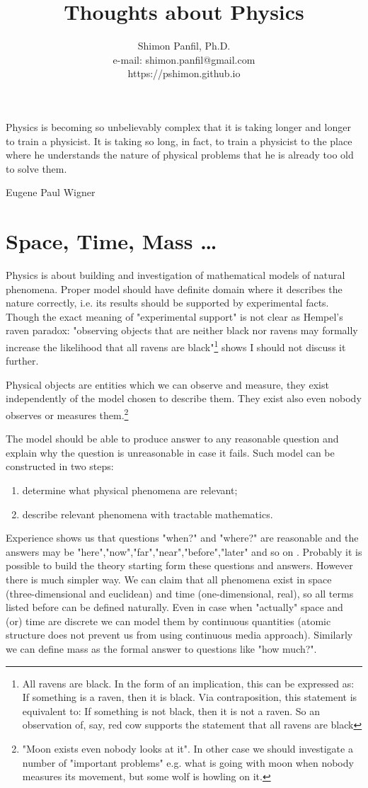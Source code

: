 \documentclass[11pt]{report}
\title{Thoughts about Physics}
\author{Shimon Panfil, Ph.D.\\
e-mail: shimon.panfil@gmail.com\\
https://pshimon.github.io}
\begin{document}
  

\maketitle
\epigraph{Physics is becoming so unbelievably complex that it is taking longer
and longer to train a physicist. It is taking so long, in fact, to train a 
physicist to the place where he understands the nature of physical problems that 
he is already too old to solve them.}{Eugene Paul Wigner}
\tableofcontents                        
\chapter{Space, Time, Mass \ldots }
\label {math-mod}
Physics is about building and investigation of mathematical models  of natural phenomena. 
Proper model should have definite domain where it describes the nature correctly, i.e.
its results should be supported by experimental facts. Though the exact 
meaning of "experimental support" is not clear as Hempel's raven paradox: "observing
objects that are neither black nor ravens may formally increase the likelihood 
that all ravens are black"\footnote{All ravens are black. In the form of an 
implication, this can be expressed as: If something is a raven, then it 
is black. Via contraposition, this statement is equivalent to: If something is 
not black, then it is not a raven. So an observation of, say, red cow supports 
the statement that all ravens are black} shows I should not discuss it further.

Physical objects are entities which we can observe and measure, they exist 
independently of the model chosen to describe them. They exist
also even nobody observes or measures them.\footnote{"Moon exists even nobody looks at it".
In other case we should investigate a number of "important problems" e.g. what is going
with moon when nobody measures its movement, but some wolf is howling on it.}

The model should be able to produce answer
to any reasonable question and explain why the question is
unreasonable in case it fails. Such model can be constructed in two steps:
\begin{enumerate}
    \item determine what physical phenomena are relevant;
        \item describe relevant phenomena with tractable mathematics. 
\end{enumerate}

Experience shows us that questions "when?" and "where?" are reasonable and the answers may be
"here","now","far","near","before","later" and so on . Probably it is possible to build 
the theory starting form these questions and answers. However there is much simpler way.
We can claim that all phenomena exist in space (three-dimensional and euclidean) 
and time (one-dimensional, real), so all terms listed before can be defined naturally.
Even in case when "actually" space and (or) time are discrete we can model them
by continuous quantities (atomic structure does not prevent us from using
continuous media approach). Similarly we can define mass as the formal answer 
to questions like "how much?".
\end{document}
